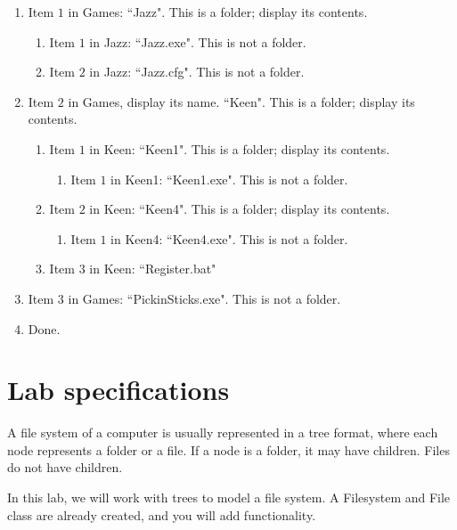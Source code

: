\documentclass[a4paper,12pt,oneside]{book}
\begin{document}
\begin{enumerate}
    \item   Item $1$ in Games: ``Jazz". This is a folder; display its contents.
    \begin{enumerate}
        \item   Item $1$ in Jazz: ``Jazz.exe". This is not a folder.
        \item   Item $2$ in Jazz: ``Jazz.cfg". This is not a folder.
    \end{enumerate}
    
    \item   Item $2$ in Games, display its name. ``Keen". This is a folder; display its contents.
    \begin{enumerate}
        \item   Item $1$ in Keen: ``Keen1". This is a folder; display its contents.
        \begin{enumerate}
            \item   Item $1$ in Keen1: ``Keen1.exe". This is not a folder.
        \end{enumerate}
        
        \item   Item $2$ in Keen: ``Keen4". This is a folder; display its contents.
        \begin{enumerate}
            \item   Item $1$ in Keen4: ``Keen4.exe". This is not a folder.
        \end{enumerate}

        \item   Item $3$ in Keen: ``Register.bat"
    \end{enumerate}
    
    \item   Item $3$ in Games: ``PickinSticks.exe". This is not a folder.
    \item   Done.
\end{enumerate}

\newpage

\section{Lab specifications}

A file system of a computer is usually represented in a tree format, where each node represents a folder or a file.
If a node is a folder, it may have children. Files do not have children.

In this lab, we will work with trees to model a file system.
A Filesystem and File class are already created, and you will add functionality.
\end{document}
